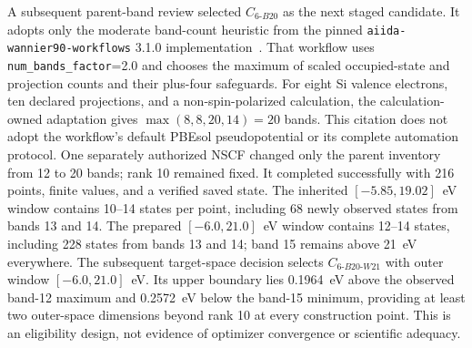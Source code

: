 \documentclass[11pt]{article}
\begin{document}
A subsequent parent-band review selected $C_{6\text{-}B20}$ as the next staged
candidate.  It adopts only the moderate band-count heuristic from the pinned
\texttt{aiida-wannier90-workflows} 3.1.0 implementation~\cite{AiiDAWannier90Workflows310}.
That workflow uses \texttt{num\_bands\_factor}=2.0 and chooses the maximum of scaled
occupied-state and projection counts and their plus-four safeguards.  For eight Si
valence electrons, ten declared projections, and a non-spin-polarized calculation, the
calculation-owned adaptation gives $\max(8,8,20,14)=20$ bands.  This citation does not
adopt the workflow's default PBEsol pseudopotential or its complete automation
protocol.  One separately authorized NSCF changed only the parent inventory from 12
to 20 bands; rank 10 remained fixed.  It completed successfully with 216 points, finite
values, and a verified saved state.  The inherited $[-5.85,19.02]$~eV window contains
10--14 states per point, including 68 newly observed states from bands 13 and 14.  The
prepared $[-6.0,21.0]$~eV window contains 12--14 states, including 228 states from
bands 13 and 14; band 15 remains above 21~eV everywhere.  The subsequent target-space
decision selects $C_{6\text{-}B20\text{-}W21}$ with outer window
$[-6.0,21.0]$~eV.  Its upper boundary lies 0.1964~eV above the observed band-12
maximum and 0.2572~eV below the band-15 minimum, providing at least two outer-space
dimensions beyond rank 10 at every construction point.  This is an eligibility design,
not evidence of optimizer convergence or scientific adequacy.
\end{document}
